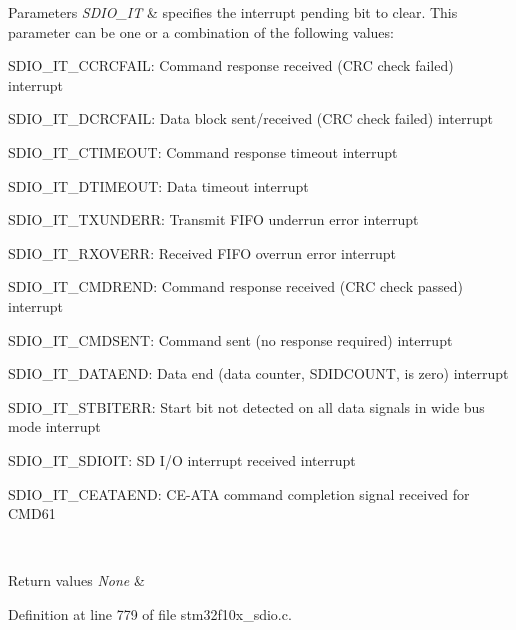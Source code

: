 \begin{DoxyParams}{Parameters}
{\em S\+D\+I\+O\+\_\+\+IT} & specifies the interrupt pending bit to clear. This parameter can be one or a combination of the following values\+: \begin{DoxyItemize}
\item S\+D\+I\+O\+\_\+\+I\+T\+\_\+\+C\+C\+R\+C\+F\+A\+IL\+: Command response received (C\+RC check failed) interrupt \item S\+D\+I\+O\+\_\+\+I\+T\+\_\+\+D\+C\+R\+C\+F\+A\+IL\+: Data block sent/received (C\+RC check failed) interrupt \item S\+D\+I\+O\+\_\+\+I\+T\+\_\+\+C\+T\+I\+M\+E\+O\+UT\+: Command response timeout interrupt \item S\+D\+I\+O\+\_\+\+I\+T\+\_\+\+D\+T\+I\+M\+E\+O\+UT\+: Data timeout interrupt \item S\+D\+I\+O\+\_\+\+I\+T\+\_\+\+T\+X\+U\+N\+D\+E\+RR\+: Transmit F\+I\+FO underrun error interrupt \item S\+D\+I\+O\+\_\+\+I\+T\+\_\+\+R\+X\+O\+V\+E\+RR\+: Received F\+I\+FO overrun error interrupt \item S\+D\+I\+O\+\_\+\+I\+T\+\_\+\+C\+M\+D\+R\+E\+ND\+: Command response received (C\+RC check passed) interrupt \item S\+D\+I\+O\+\_\+\+I\+T\+\_\+\+C\+M\+D\+S\+E\+NT\+: Command sent (no response required) interrupt \item S\+D\+I\+O\+\_\+\+I\+T\+\_\+\+D\+A\+T\+A\+E\+ND\+: Data end (data counter, S\+D\+I\+D\+C\+O\+U\+NT, is zero) interrupt \item S\+D\+I\+O\+\_\+\+I\+T\+\_\+\+S\+T\+B\+I\+T\+E\+RR\+: Start bit not detected on all data signals in wide bus mode interrupt \item S\+D\+I\+O\+\_\+\+I\+T\+\_\+\+S\+D\+I\+O\+IT\+: SD I/O interrupt received interrupt \item S\+D\+I\+O\+\_\+\+I\+T\+\_\+\+C\+E\+A\+T\+A\+E\+ND\+: C\+E-\/\+A\+TA command completion signal received for C\+M\+D61 \end{DoxyItemize}
\\
\hline
\end{DoxyParams}

\begin{DoxyRetVals}{Return values}
{\em None} & \\
\hline
\end{DoxyRetVals}


Definition at line 779 of file stm32f10x\+\_\+sdio.\+c.

\mbox{\label{group___s_d_i_o___exported___functions_ga7243b857d6b323748ff3a493b265bedc}} 
